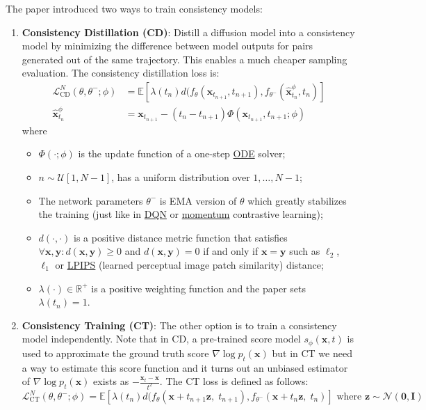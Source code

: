 \documentclass[12pt]{article}
\begin{document}
The paper introduced two ways to train consistency models:
\begin{enumerate}
    \item \textbf{Consistency Distillation (CD)}: Distill a diffusion model into a consistency model by minimizing the difference between model outputs for pairs generated out of the same trajectory. This enables a much cheaper sampling evaluation. The consistency distillation loss is:
    \[
    \begin{aligned}
    \mathcal{L}^N_\text{CD} (\theta, \theta^-; \phi) &= \mathbb{E}
    [\lambda(t_n)d(f_\theta(\mathbf{x}_{t_{n+1}}, t_{n+1}), f_{\theta^-}(\hat{\mathbf{x}}^\phi_{t_n}, t_n)] \\
    \hat{\mathbf{x}}^\phi_{t_n} &= \mathbf{x}_{t_{n+1}} - (t_n - t_{n+1}) \Phi(\mathbf{x}_{t_{n+1}}, t_{n+1}; \phi)
    \end{aligned}
    \]
    where
    \begin{itemize}
        \item $\Phi(\cdot;\phi)$ is the update function of a one-step \href{https://en.wikipedia.org/wiki/Ordinary_differential_equation}{ODE} solver;
        \item $n \sim \mathcal{U}[1, N-1]$, has a uniform distribution over $1, \dots, N-1$;
        \item The network parameters $\theta^-$ is EMA version of $\theta$ which greatly stabilizes the training (just like in \href{https://lilianweng.github.io/posts/2018-02-19-rl-overview/#deep-q-network}{DQN} or \href{https://lilianweng.github.io/posts/2021-05-31-contrastive/#moco--moco-v2}{momentum} contrastive learning);
        \item $d(\cdot,\cdot)$ is a positive distance metric function that satisfies $\forall \mathbf{x}, \mathbf{y}: d(\mathbf{x}, \mathbf{y}) \geq 0$ and $d(\mathbf{x}, \mathbf{y}) = 0$ if and only if $\mathbf{x} = \mathbf{y}$ such as $\ell_2$, $\ell_1$ or \href{https://arxiv.org/abs/1801.03924}{LPIPS} (learned perceptual image patch similarity) distance;
        \item $\lambda(\cdot) \in \mathbb{R}^+$ is a positive weighting function and the paper sets $\lambda(t_n)=1$.
    \end{itemize}
    \item \textbf{Consistency Training (CT)}: The other option is to train a consistency model independently. Note that in CD, a pre-trained score model $s_\phi(\mathbf{x}, t)$ is used to approximate the ground truth score $\nabla\log p_t(\mathbf{x})$ but in CT we need a way to estimate this score function and it turns out an unbiased estimator of $\nabla\log p_t(\mathbf{x})$ exists as $-\frac{\mathbf{x}_t - \mathbf{x}}{t^2}$. The CT loss is defined as follows:
    \[
    \mathcal{L}^N_\text{CT} (\theta, \theta^-; \phi) = \mathbb{E}
    [\lambda(t_n)d(f_\theta(\mathbf{x} + t_{n+1} \mathbf{z},\;t_{n+1}), f_{\theta^-}(\mathbf{x} + t_n \mathbf{z},\;t_n)]
    \text{ where }\mathbf{z} \sim \mathcal{N}(\mathbf{0}, \mathbf{I})
    \]
\end{enumerate}
\end{document}
